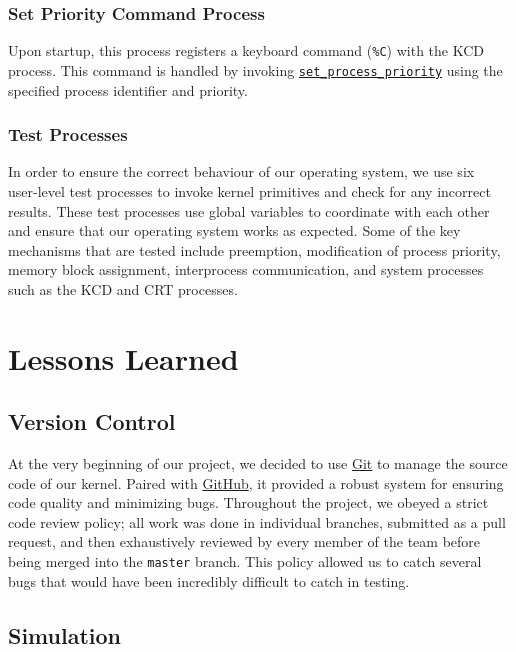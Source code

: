 \documentclass[12pt]{report}
\begin{document}
\subsection{Set Priority Command Process}

Upon startup, this process registers a keyboard command (\texttt{\%C}) with the KCD process. This command is handled by invoking \hyperref[alg:processpriority]{\texttt{set_process_priority}} using the specified process identifier and priority.

\subsection{Test Processes}

In order to ensure the correct behaviour of our operating system, we use six user-­level test processes to invoke kernel primitives and check for any incorrect results. These test processes use global variables to coordinate with each other and ensure that  our operating system works as expected. Some of the key mechanisms that are tested include preemption, modification of process priority, memory block assignment, interprocess communication, and system processes such as the KCD and CRT processes.

\chapter{Lessons Learned}

\section{Version Control}

At the very beginning of our project, we decided to use \href{http://git-scm.com/}{Git} to manage the source code of our kernel. Paired with \href{http://github.com/}{GitHub}, it provided a robust system for ensuring code quality and minimizing bugs. Throughout the project, we obeyed a strict code review policy; all work was done in individual branches, submitted as a pull request, and then exhaustively reviewed by every member of the team before being merged into the \texttt{master} branch. This policy allowed us to catch several bugs that would have been incredibly difficult to catch in testing.

\section{Simulation}
\end{document}
